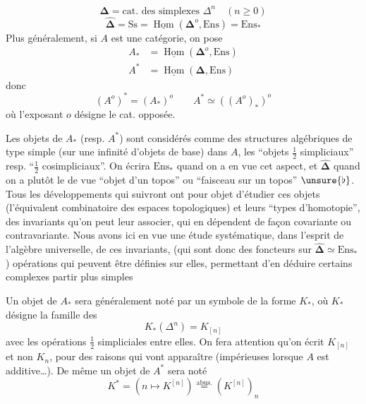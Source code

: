 \[
\boldsymbol\Delta=\text{cat. des simplexes }\Delta^n\quad(n\geq0)
\]
\[
\widehat{\boldsymbol\Delta}=\mathrm{Ss}=\underline{\operatorname{Hom}}(\boldsymbol\Delta^o,\mathrm{Ens})=\mathrm{Ens}_*
\]
Plus généralement, si $A$ est une catégorie, on pose
\[
\begin{aligned}
A_*&=\underline{\operatorname{Hom}}(\boldsymbol\Delta^o,\mathrm{Ens})\\
A^*&=\underline{\operatorname{Hom}}(\boldsymbol\Delta,\mathrm{Ens})
\end{aligned}
\]
donc
\[ (A^o)^*=(A_*)^o\qquad A^*\simeq((A^o)_*)^o \]
où l'exposant $o$ désigne le  cat. opposée.

Les objets de $A_*$ (resp. $A^*$) sont considérés comme des structures algébriques de type simple (sur une infinité d'objets de base) dans $A$, les ``objets $\tfrac12$ simpliciaux'' resp. ``$\tfrac12$ cosimpliciaux''. On écrira $\mathrm{Ens}_*$ quand on a en vue cet aspect, et $\widehat{\boldsymbol\Delta}$  quand on a plutôt le  de vue ``objet d'un topos'' ou ``faisceau sur un topos'' $\unsure{\flat}$. Tous les développements qui suivront ont pour objet d'étudier ces objets (l'équivalent combinatoire des espaces topologiques) et leurs ``types d'homotopie'',  des invariants qu'on peut leur associer, qui en dépendent de façon covariante ou contravariante. Nous avons ici en vue une étude systématique, dans l'esprit de l'algèbre universelle, de ces invariants, (qui sont donc des foncteurs sur $\widehat{\boldsymbol\Delta}\simeq\mathrm{Ens}_*$)   opérations qui peuvent être définies sur elles, permettant d'en déduire certains complexes  partir  plus simples


Un objet de $A_*$ sera généralement noté par un symbole de la forme $K_*$, où $K_*$ désigne la famille des
\[ K_*(\Delta^n)=K_{[n]} \]
avec les opérations $\tfrac12$ simpliciales entre elles.
On fera attention qu'on écrit $K_{[n]}$ et non $K_n$, pour des raisons qui vont apparaître (impérieuses lorsque $A$ est additive\ldots).
De même un objet de $A^*$ sera noté
\[ K^*=(n\longmapsto K^{[n]})\overset{\text{abus.}}{=}(K^{[n]})_n \]

